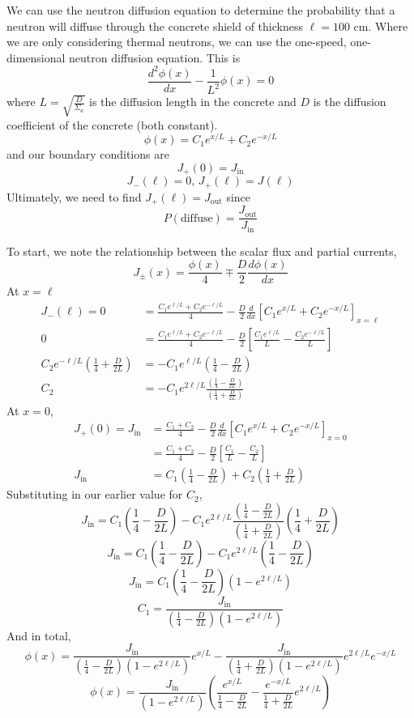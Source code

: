 \documentclass{article}
\begin{document}
We can use the neutron diffusion equation to determine the probability that a neutron will diffuse through the concrete shield of thickness $\ell = 100\text{ cm}$. Where we are only considering thermal neutrons, we can use the one-speed, one-dimensional neutron diffusion equation. This is
$$ \frac{d^2\phi(x)}{dx} - \frac{1}{L^2}\phi(x) = 0 $$
where $L = \sqrt{\frac{D}{\Sigma_a}}$ is the diffusion length in the concrete and $D$ is the diffusion coefficient of the concrete (both constant).
$$ \phi(x) = C_1e^{x/L} + C_2e^{-x/L} $$
and our boundary conditions are
$$ J_+(0) = J_{\text{in}} $$
$$ J_-(\ell) = 0, \, J_+(\ell) = J(\ell) $$
Ultimately, we need to find $J_+(\ell) = J_{\text{out}}$ since
$$ P(\text{diffuse}) = \frac{J_{\text{out}}}{J_{\text{in}}} $$

To start, we note the relationship between the scalar flux and partial currents,
$$ J_{\pm}(x) = \frac{\phi(x)}{4} \mp \frac{D}{2}\frac{d\phi(x)}{dx} $$
At $x = \ell$
\begin{align*}
J_-(\ell) =	0	&= \frac{C_1e^{\ell/L} + C_2e^{-\ell/L}}{4} - \frac{D}{2}\frac{d}{dx}\left[C_1e^{x/L} + C_2e^{-x/L}\right]_{x=\ell} \\
			0	&= \frac{C_1e^{\ell/L} + C_2e^{-\ell/L}}{4} - \frac{D}{2}\left[\frac{C_1e^{\ell/L}}{L} - \frac{C_2e^{-\ell/L}}{L}\right] \\
C_2e^{-\ell/L}\left(\frac{1}{4} + \frac{D}{2L}  \right) &= -C_1e^{\ell/L}\left(\frac{1}{4} - \frac{D}{2L}  \right) \\
C_2 &= -C_1e^{2\ell/L}\frac{\left(\frac{1}{4} - \frac{D}{2L}\right)}{\left(\frac{1}{4} + \frac{D}{2L}\right)}
\end{align*}
At $x = 0$, 
\begin{align*}
J_+(0) =	J_{\text{in}}	&= \frac{C_1 + C_2}{4} - \frac{D}{2}\frac{d}{dx}\left[C_1e^{x/L} + C_2e^{-x/L}\right]_{x=0} \\
						&= \frac{C_1 + C_2}{4} - \frac{D}{2}\left[\frac{C_1}{L} - \frac{C_2}{L}\right] \\
			J_{\text{in}}	&= C_1\left(\frac{1}{4} - \frac{D}{2L}\right) + C_2\left(\frac{1}{4} + \frac{D}{2L}\right)
\end{align*}
Substituting in our earlier value for $C_2$,
$$ J_{\text{in}} = C_1\left(\frac{1}{4} - \frac{D}{2L}\right) -C_1e^{2\ell/L}\frac{\left(\frac{1}{4} - \frac{D}{2L}\right)}{\left(\frac{1}{4} + \frac{D}{2L}\right)}\left(\frac{1}{4} + \frac{D}{2L}\right)$$
$$ J_{\text{in}} = C_1\left(\frac{1}{4} - \frac{D}{2L}\right) -C_1e^{2\ell/L}\left(\frac{1}{4} - \frac{D}{2L}\right)$$
$$ J_{\text{in}} = C_1\left(\frac{1}{4} - \frac{D}{2L}\right)\left(1 -e^{2\ell/L}\right)$$
$$ C_1 = \frac{J_{\text{in}}}{\left(\frac{1}{4} - \frac{D}{2L}\right)\left(1 -e^{2\ell/L}\right)} $$
And in total,
$$ \phi(x) = \frac{J_{\text{in}}}{\left(\frac{1}{4} - \frac{D}{2L}\right)\left(1 -e^{2\ell/L}\right)}e^{x/L} -\frac{J_{\text{in}}}{\left(\frac{1}{4} + \frac{D}{2L}\right)\left(1 -e^{2\ell/L}\right)}e^{2\ell/L}e^{-x/L} $$
$$ \phi(x) = \frac{J_{\text{in}}}{\left(1 -e^{2\ell/L}\right)}\left(\frac{e^{x/L}}{\frac{1}{4} - \frac{D}{2L}} -\frac{e^{-x/L}}{\frac{1}{4} + \frac{D}{2L}}e^{2\ell/L}\right) $$
\end{document}
